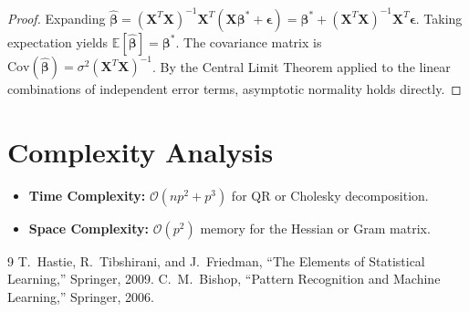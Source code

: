 \documentclass[11pt,a4paper]{article}
\theoremstyle{definition}
\begin{document}
\begin{proof}
Expanding $\hat{\boldsymbol{\beta}} = (\mathbf{X}^T \mathbf{X})^{-1} \mathbf{X}^T (\mathbf{X} \boldsymbol{\beta}^* + \boldsymbol{\epsilon}) = \boldsymbol{\beta}^* + (\mathbf{X}^T \mathbf{X})^{-1} \mathbf{X}^T \boldsymbol{\epsilon}$.
Taking expectation yields $\mathbb{E}[\hat{\boldsymbol{\beta}}] = \boldsymbol{\beta}^*$. The covariance matrix is $\text{Cov}(\hat{\boldsymbol{\beta}}) = \sigma^2 (\mathbf{X}^T \mathbf{X})^{-1}$. By the Central Limit Theorem applied to the linear combinations of independent error terms, asymptotic normality holds directly.
\end{proof}

\section{Complexity Analysis}
\begin{itemize}
    \item \textbf{Time Complexity:} $\mathcal{O}(n p^2 + p^3)$ for QR or Cholesky decomposition.
    \item \textbf{Space Complexity:} $\mathcal{O}(p^2)$ memory for the Hessian or Gram matrix.
\end{itemize}

\begin{thebibliography}{9}
 T.~Hastie, R.~Tibshirani, and J.~Friedman, ``The Elements of Statistical Learning,'' Springer, 2009.
 C.~M.~Bishop, ``Pattern Recognition and Machine Learning,'' Springer, 2006.
\end{thebibliography}
\end{document}
